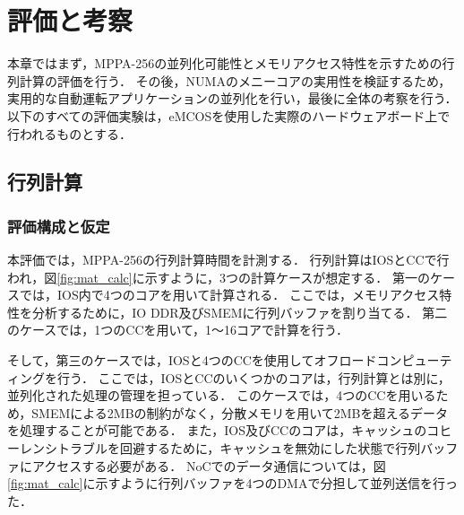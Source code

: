 \documentclass[submit,techrep]{ipsj_v2/UTF8/ipsj}
\begin{document}
\section{評価と考察}
\label{sec:evaluations}
本章ではまず，MPPA-256の並列化可能性とメモリアクセス特性を示すための行列計算の評価を行う．
その後，NUMAのメニーコアの実用性を検証するため，実用的な自動運転アプリケーションの並列化を行い，最後に全体の考察を行う．
以下のすべての評価実験は，eMCOSを使用した実際のハードウェアボード上で行われるものとする．


\subsection{行列計算}
\label{sec:martix_eval}

\subsubsection{評価構成と仮定}
\label{sec:situations_and_assumptions}
本評価では，MPPA-256の行列計算時間を計測する．
行列計算はIOSとCCで行われ，図\ref{fig:mat_calc}に示すように，3つの計算ケースが想定する．
第一のケースでは，IOS内で4つのコアを用いて計算される．
ここでは，メモリアクセス特性を分析するために，IO DDR及びSMEMに行列バッファを割り当てる．
第二のケースでは，1つのCCを用いて，1～16コアで計算を行う．

そして，第三のケースでは，IOSと4つのCCを使用してオフロードコンピューティングを行う．
ここでは，IOSとCCのいくつかのコアは，行列計算とは別に，並列化された処理の管理を担っている．
このケースでは，4つのCCを用いるため，SMEMによる2MBの制約がなく，分散メモリを用いて2MBを超えるデータを処理することが可能である．
また，IOS及びCCのコアは，キャッシュのコヒーレンシトラブルを回避するために，キャッシュを無効にした状態で行列バッファにアクセスする必要がある．
NoCでのデータ通信については，図\ref{fig:mat_calc}に示すように行列バッファを4つのDMAで分担して並列送信を行った．
\end{document}
